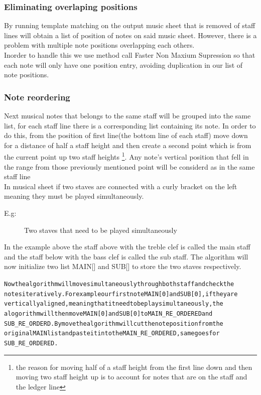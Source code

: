 \documentclass[a4paper,12pt]{report}
\begin{document}
\subsubsection{Eliminating overlaping positions}
By running template matching on the output music sheet that is removed of staff
lines will obtain a list of position of notes on said music sheet. However, 
there is a problem with multiple note positions overlapping each others.\\

Inorder to handle this we use  \textcite{Rosebrock} method call Faster Non
Maxium Supression so that each note will only have one position entry, avoiding
duplication in our list of note positions.\\

\subsubsection{Note reordering}
Next musical notes that belongs to the same staff will be grouped into the same
list,  for each staff line there is a corresponding list containing its note.
In order to do this, from the position of first line(the bottom line of each
staff) move down for a distance of half a staff height and then create a second
point which is from the current point up two staff heights \footnote{the reason
for moving half of a staff height from the first line down and then moving two
staff height up  is to account for notes that are on the staff and the ledger
line}. Any note's vertical position that fell in the range from those previously
mentioned point will be considerd as in the same staff line\\

In musical sheet if two staves are connected with a curly bracket on the left
meaning they must be played simultaneously.

E.g:\\ 
\begin{figure}[h]
\caption{Two staves that need to be played simultaneously}
\label{fig:two staves}
\end{figure}

In the example above the staff above with the treble clef is called the main
staff and the staff below with the bass clef is called the sub staff. The 
algorithm will now initialize two list MAIN[] and SUB[] to store the two staves
respectively.

\begin{alltt}
    \normalfont
Now the algorithm will move simultaneously through both staff and check the
notes iteratively. For example our first note MAIN[0] and SUB[0], if they are
vertically aligned, meaning that it need to be play simultaneously, the
alogorithm will then move MAIN[0] and SUB[0] to MAIN\_RE\_ORDERED and
SUB\_RE\_ORDERD. By move the algorithm will cut the note position from the
original MAIN list and paste it into the MAIN\_RE\_ORDERED, same goes for
SUB\_RE\_ORDERED.
\end{alltt}
\end{document}
